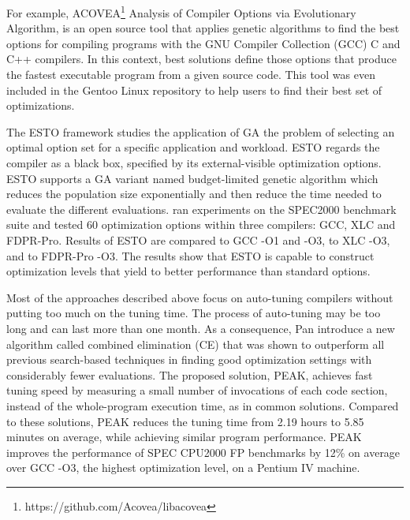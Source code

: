For example, ACOVEA\footnote{https://github.com/Acovea/libacovea}  \added{(}Analysis of Compiler Options via Evolutionary Algorithm\added{)}, is an open source tool that applies genetic algorithms to find the best options for compiling programs with the GNU Compiler Collection (GCC) C and C++ compilers. In this context, best solutions define those options that produce the fastest executable program from a given source code. This tool was even included in the Gentoo Linux
repository to help users to find their best set of optimizations.

The ESTO framework\cite{bashkansky2007black} studies the application of GA  the problem of selecting an optimal option set for a specific application and workload. ESTO regards the compiler as a black box, specified by its external-visible optimization options. ESTO supports a GA variant named budget-limited genetic algorithm which reduces the population size exponentially and then reduce the time needed to evaluate the different evaluations.  ran experiments on the SPEC2000 benchmark suite and tested 60 optimization options within three compilers: GCC, XLC and FDPR-Pro. Results of ESTO are compared to GCC -O1 and -O3, to XLC -O3, and to FDPR-Pro -O3. The results show that ESTO is capable to construct optimization levels that yield to better performance than standard options.


Most of the approaches described above focus on auto-tuning compilers without putting too much  on the tuning time. The process of auto-tuning may be too long and can last more than one month\cite{hoste2008cole}. As a consequence, Pan \etal\cite{pan2006fast} introduce a new algorithm called combined elimination (CE) that was shown to outperform all previous search-based techniques in finding good optimization settings with considerably fewer evaluations. The proposed solution, PEAK, achieves fast tuning speed by measuring a small number of invocations of each code section, instead of the whole-program execution time, as in common solutions. Compared to these solutions, PEAK reduces the tuning time from 2.19 hours to 5.85 minutes on average, while achieving similar program performance.
PEAK improves the performance of SPEC CPU2000 FP benchmarks by 12\% on average over GCC -O3, the highest optimization level, on a Pentium IV machine.



